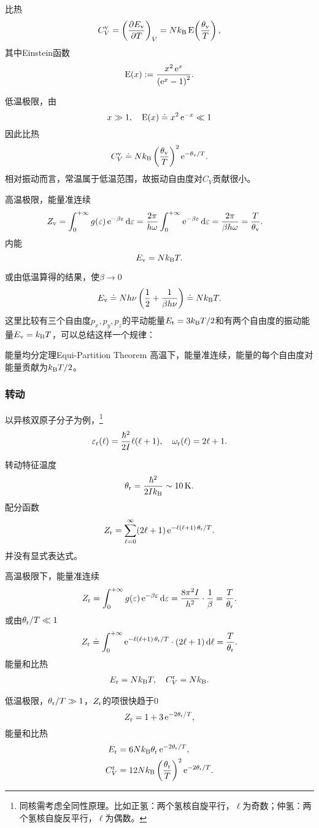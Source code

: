 比热
\begin{align}
	C_V^\vb=\kh{\pv{E_\vb}T}_V=N\kB\Einst\!\kh{\frac{\theta_\vb}T},
\end{align}
其中Einstein函数
\[
	\Einst(x):=\frac{x^2\e x}{\kh{\e x-1}^2}.
\]

低温极限，由
\[
	x\gg 1,\quad\Einst(x)\doteq x^2\e{-x}\ll 1
\]
因此比热
\begin{align}
	C_V^\vb\doteq N\kB\kh{\frac{\theta_\vb}T}^2\e{-\theta_\vb/T}.
\end{align}
相对振动而言，常温属于低温范围，故振动自由度对$C_V$贡献很小。

高温极限，能量准连续
\begin{align*}
	Z_\vb & =\int\zti g(\ve)\e{-\beta\ve}\d\ve=\frac{2\pi}{h\omega}\int\zti\e{-\beta\ve}\d\ve=\frac{2\pi}{\beta h\omega}=\frac T{\theta_\vb}.
\end{align*}
内能
\[
	E_\vb=N\kB T.
\]

或由低温算得的结果，使$\beta\to0$
\[
	E_\vb\doteq Nh\nu\kh{\frac12+\frac1{\beta h\nu}}\doteq N\kB T.
\]
这里比较有三个自由度$p_x,p_y,p_z$的平动能量$E_\tl=3\kB T/2$和有两个自由度的振动能量$E_\vb=\kB T$，可以总结这样一个规律：
\begin{theorem}{能量均分定理}{Equi-Partition Theorem}
	高温下，能量准连续，能量的每个自由度对能量贡献为$\kB T/2$。
\end{theorem}
\subsubsection*{转动}
以异核双原子分子为例，\footnote{同核需考虑全同性原理。比如正氢：两个氢核自旋平行，$\ell$为奇数；仲氢：两个氢核自旋反平行，$\ell$为偶数。}
\[
	\varepsilon_\rt(\ell)=\frac{\hbar^2}{2I}\ell(\ell+1),\quad\omega_\rt(\ell)=2\ell+1.
\]

转动特征温度
\[
	\ct_\rt=\frac{\hbar^2}{2I\kB}\sim\SI{10}\K.
\]
配分函数
\[
	Z_\rt=\sum\fmto{\ell}0(2\ell+1)\e{-\ell(\ell+1)\,\theta_\rt/T}.
\]
并没有显式表达式。

高温极限下，能量准连续
\[
	Z_\rt=\int\zti g(\ve)\e{-\beta\ve}\d\ve=\frac{8\pi^2I}{h^2}\cdot\frac1\beta=\frac T{\theta_\rt}.
\]
或由$\ct_\rt/T\ll 1$
\[
	Z_\rt\doteq\int_0^{+\infty}\e{-\ell(\ell+1)\,\theta_\rt/T}\cdot(2\ell+1)\d\ell=\frac T{\ct_\rt}.
\]
能量和比热
\begin{align}
	E_\rt=N\kB T,\quad C_V^\rt=N\kB.
\end{align}

低温极限，$\ct_\rt/T\gg 1$，$Z_\rt$的项很快趋于0
\[
	Z_\rt=1+3\e{-2\ct_\rt/T},
\]
能量和比热
\begin{align}
	E_\rt&=6N\kB\ct_\rt\e{-2\ct_\rt/T},\\
	C_V^\rt&=12N\kB\kh{\frac{\ct_\rt}T}^2\e{-2\ct_\rt/T}.
\end{align}

